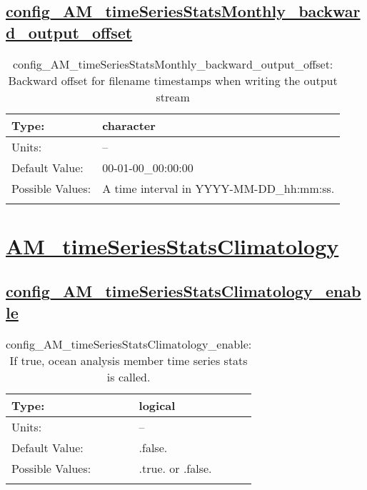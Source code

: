 \subsection[config\_AM\_timeSeriesStatsMonthly\_backward\_output\_offset]{\hyperref[sec:nm_tab_AM_timeSeriesStatsMonthly]{config\_AM\_timeSeriesStatsMonthly\_backward\_output\_offset}}
\label{subsec:nm_sec_config_AM_timeSeriesStatsMonthly_backward_output_offset}
\begin{center}
\begin{longtable}{| p{2.0in} || p{4.0in} |}
    \hline
    Type: & character \\
    \hline
    Units: & -- \\
    \hline
    Default Value: & 00-01-00\_00:00:00 \\
    \hline
    Possible Values: & A time interval in YYYY-MM-DD\_hh:mm:ss. \\
    \hline
    \caption{config\_AM\_timeSeriesStatsMonthly\_backward\_output\_offset: Backward offset for filename timestamps when writing the output stream}
\end{longtable}
\end{center}
\section[AM\_timeSeriesStatsClimatology]{\hyperref[sec:nm_tab_AM_timeSeriesStatsClimatology]{AM\_timeSeriesStatsClimatology}}
\label{sec:nm_sec_AM_timeSeriesStatsClimatology}
\subsection[config\_AM\_timeSeriesStatsClimatology\_enable]{\hyperref[sec:nm_tab_AM_timeSeriesStatsClimatology]{config\_AM\_timeSeriesStatsClimatology\_enable}}
\label{subsec:nm_sec_config_AM_timeSeriesStatsClimatology_enable}
\begin{center}
\begin{longtable}{| p{2.0in} || p{4.0in} |}
    \hline
    Type: & logical \\
    \hline
    Units: & -- \\
    \hline
    Default Value: & .false. \\
    \hline
    Possible Values: & .true. or .false. \\
    \hline
    \caption{config\_AM\_timeSeriesStatsClimatology\_enable: If true, ocean analysis member time series stats is called.}
\end{longtable}
\end{center}
